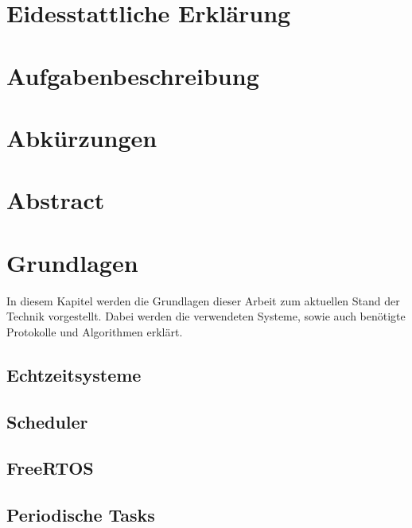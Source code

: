 \documentclass{scrartcl}
\begin{document}
	\begin{titlepage}
		
	\end{titlepage}
	\clearpage 
	\section*{Eidesstattliche Erklärung}
		
		\clearpage
	\section*{Aufgabenbeschreibung}
		
		\clearpage
	\tableofcontents
	\clearpage
	\listoffigures
	\listoftables
	\clearpage
	\lstlistoflistings
	\clearpage
	\section*{Abkürzungen}
		
		\clearpage
	\section*{Abstract}
		
	\clearpage
	\section{Grundlagen}
		In diesem Kapitel werden die Grundlagen dieser Arbeit zum aktuellen Stand der Technik vorgestellt.
		Dabei werden die verwendeten Systeme, sowie auch benötigte Protokolle und Algorithmen erklärt.
		\subsection{Echtzeitsysteme} \label{section:echtzeitsysteme}
			
		\subsection{Scheduler} \label{section:scheduler}
			
		\subsection{FreeRTOS} \label{section:freertos}
			
		\subsection{Periodische Tasks} \label{section:periodische_tasks}
			
\end{document}
